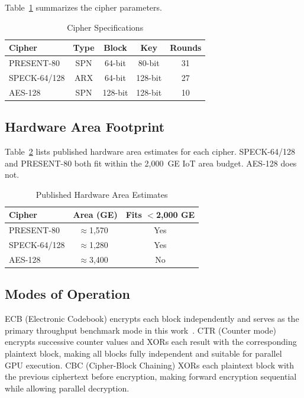 \documentclass[conference]{IEEEtran}
\begin{document}
Table~\ref{tab:specs} summarizes the cipher parameters.

\begin{table}[t]
\caption{Cipher Specifications}
\label{tab:specs}
\begin{center}
\begin{tabular}{|l|c|c|c|c|}
\hline
\textbf{Cipher} & \textbf{Type} & \textbf{Block} & \textbf{Key} & \textbf{Rounds} \\
\hline
PRESENT-80     & SPN & 64-bit  & 80-bit  & 31 \\
SPECK-64/128   & ARX & 64-bit  & 128-bit & 27 \\
AES-128        & SPN & 128-bit & 128-bit & 10 \\
\hline
\end{tabular}
\end{center}
\end{table}

\subsection{Hardware Area Footprint}

Table~\ref{tab:ge} lists published hardware area estimates for each cipher. SPECK-64/128 and
PRESENT-80 both fit within the 2,000~GE IoT area budget. AES-128 does not.

\begin{table}[t]
\caption{Published Hardware Area Estimates}
\label{tab:ge}
\begin{center}
\begin{tabular}{|l|c|c|}
\hline
\textbf{Cipher} & \textbf{Area (GE)} & \textbf{Fits $<$2,000 GE} \\
\hline
PRESENT-80    & $\approx$1,570~\cite{present} & Yes \\
SPECK-64/128  & $\approx$1,280~\cite{speck}   & Yes \\
AES-128       & $\approx$3,400~\cite{fips197}  & No  \\
\hline
\end{tabular}
\end{center}
\end{table}

\subsection{Modes of Operation}

ECB (Electronic Codebook) encrypts each block independently and serves as the primary throughput
benchmark mode in this work~\cite{sp80038a}. CTR (Counter mode) encrypts successive counter values
and XORs each result with the corresponding plaintext block, making all blocks fully independent
and suitable for parallel GPU execution. CBC (Cipher-Block Chaining) XORs each plaintext block
with the previous ciphertext before encryption, making forward encryption sequential while
allowing parallel decryption.
\end{document}
